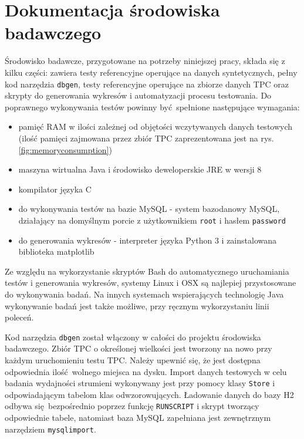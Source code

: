 \documentclass[12pt,twoside,openright]{extarticle}
\begin{document}
\appendix
\section{Dokumentacja środowiska badawczego}

    Środowisko badawcze, przygotowane na potrzeby niniejszej pracy, składa się z kilku części: zawiera testy referencyjne operujące na danych syntetycznych, pełny kod narzędzia \texttt{dbgen}, testy referencyjne operujące na zbiorze danych TPC oraz skrypty do generowania wykresów i automatyzacji procesu testowania. Do poprawnego wykonywania testów powinny być spełnione następujące wymagania:
    
\begin{itemize}
    \item pamięć RAM w ilości zależnej od objętości wczytywanych danych testowych (ilość pamięci zajmowana przez zbiór TPC zaprezentowana jest na rys. \ref{fig:memoryconsumption})
    \item maszyna wirtualna Java i środowisko deweloperskie JRE w wersji 8
    \item kompilator języka C
    \item do wykonywania testów na bazie MySQL - system bazodanowy MySQL, działający na domyślnym porcie z użytkownikiem \texttt{root} i hasłem \texttt{password}
    \item do generowania wykresów - interpreter języka Python 3 i zainstalowana biblioteka matplotlib
\end{itemize}

    Ze względu na wykorzystanie skryptów Bash do automatycznego uruchamiania testów i generowania wykresów, systemy Linux i OSX są najlepiej przystosowane do wykonywania badań. Na innych systemach wspierających technologię Java wykonywanie badań jest także możliwe, przy ręcznym wykorzystaniu linii poleceń.

    Kod narzędzia \texttt{dbgen} został włączony w całości do projektu środowiska badawczego. Zbiór TPC o określonej wielkości jest tworzony na nowo przy każdym uruchomieniu testu TPC. Należy upewnić się, że jest dostępna odpowiednia ilość wolnego miejsca na dysku. Import danych testowych w celu badania wydajności strumieni wykonywany jest przy pomocy klasy \texttt{Store} i odpowiadającym tabelom klas odwzorowujących. Ładowanie danych do bazy H2 odbywa się bezpośrednio poprzez funkcję \texttt{RUNSCRIPT} i skrypt tworzący odpowiednie tabele, natomiast baza MySQL zapełniana jest zewnętrznym narzędziem \texttt{mysqlimport}.
\end{document}
